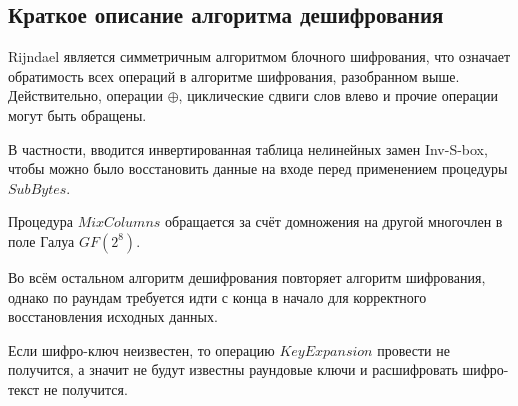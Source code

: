 \subsection{Краткое описание алгоритма дешифрования}

    Rijndael является симметричным алгоритмом блочного шифрования, что означает обратимость всех операций
    в алгоритме шифрования, разобранном выше. Действительно, операции $\oplus$, циклические сдвиги слов влево
    и прочие операции могут быть обращены.

    В частности, вводится инвертированная таблица нелинейных замен Inv-S-box,
    чтобы можно было восстановить данные на входе перед применением процедуры $SubBytes$.

    Процедура $MixColumns$ обращается за счёт домножения на другой многочлен в поле Галуа $GF(2^8)$.

    Во всём остальном алгоритм дешифрования повторяет алгоритм шифрования, однако по раундам требуется идти
    с конца в начало для корректного восстановления исходных данных.

    Если шифро-ключ неизвестен, то операцию $KeyExpansion$ провести не получится, а значит не будут известны
    раундовые ключи и расшифровать шифро-текст не получится.



